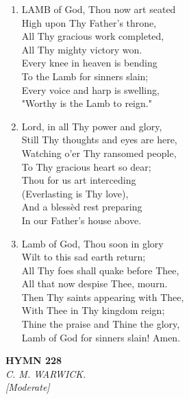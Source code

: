 \begin{enumerate}
    \item LAMB of God, Thou now art seated \\
            High upon Thy Father's throne, \\
        All Thy gracious work completed, \\
            All Thy mighty victory won. \\
        Every knee in heaven is bending \\
            To the Lamb for sinners slain; \\
        Every voice and harp is swelling, \\
            "Worthy is the Lamb to reign."

    \item Lord, in all Thy power and glory, \\
            Still Thy thoughts and eyes are here, \\
        Watching o'er Thy ransomed people, \\
            To Thy gracious heart so dear; \\
        Thou for us art interceding \\
            (Everlasting is Thy love), \\
        And a bless\`ed rest preparing \\
            In our Father's house above.

    \item Lamb of God, Thou soon in glory \\
            Wilt to this sad earth return; \\
        All Thy foes shall quake before Thee, \\
            All that now despise Thee, mourn. \\
        Then Thy saints appearing with Thee, \\
            With Thee in Thy kingdom reign; \\
        Thine the praise and Thine the glory, \\
            Lamb of God for sinners slain! Amen.

\end{enumerate}

\newpage
\begin{center}
    {\Large \textbf{HYMN 228}}
    \\
    \textit{C. M. WARWICK.}
    \\
    \textit{\small [Moderate]}
\end{center}
\vspace{1em}

